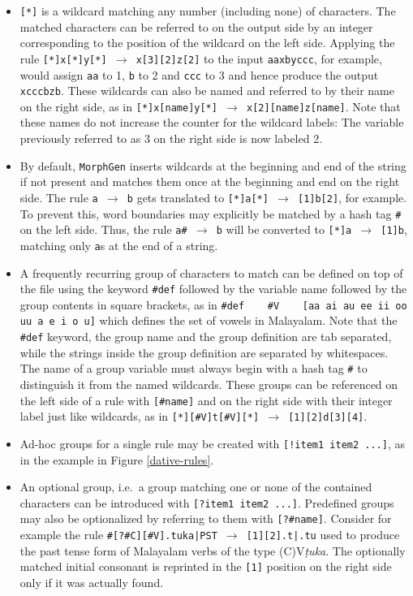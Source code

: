 \documentclass[a4paper]{article}
\newcommand{\tab}{~~~}
\newcommand{\arr}{$\rightarrow$ }
\newcommand{\typ}[1]{\texttt{#1}}
\begin{document}
\begin{itemize}
\item{} \typ{[*]} is a wildcard matching any number (including none) of characters. The matched characters can be referred to on the output side by an integer corresponding to the position of the wildcard on the left side. Applying the rule \typ{[*]x[*]y[*] \arr x[3][2]z[2]} to the input \typ{aaxbyccc}, for example, would assign \typ{aa} to 1, \typ{b} to 2 and \typ{ccc} to 3 and hence produce the output \typ{xcccbzb}. These wildcards can also be named and referred to by their name on the right side, as in \typ{[*]x[name]y[*] \arr x[2][name]z[name]}. Note that these names do not increase the counter for the wildcard labels: The variable previously referred to as 3 on the right side is now labeled 2.

\item By default, \typ{MorphGen} inserts wildcards at the beginning and end of the string if not present and matches them once at the beginning and end on the right side. The rule \typ{a \arr b} gets translated to \typ{[*]a[*] \arr [1]b[2]}, for example. To prevent this, word boundaries may explicitly be matched by a hash tag \typ{\#} on the left side. Thus, the rule \typ{a\# \arr b} will be converted to \typ{[*]a \arr [1]b}, matching only \typ{a}s at the end of a string.

\item A frequently recurring group of characters to match can be defined on top of the file using the keyword \typ{\#def} followed by the variable name followed by the group contents in square brackets, as in \typ{\#def \tab \#V \tab [aa ai au ee ii oo uu a e i o u]} which defines the set of vowels in Malayalam. Note that the \typ{\#def} keyword, the group name and the group definition are tab separated, while the strings inside the group definition are separated by whitespaces. The name of a group variable must always begin with a hash tag \typ{\#} to distinguish it from the named wildcards. These groups can be referenced on the left side of a rule with \typ{[\#name]} and on the right side with their integer label just like wildcards, as in \typ{[*][\#V]t[\#V][*] \arr [1][2]d[3][4]}.

\item Ad-hoc groups for a single rule may be created with \typ{[!item1 item2 ...]}, as in the example in Figure \ref{dative-rules}.

\item An optional group, i.e.\ a group matching one or none of the contained characters can be introduced with \typ{[?item1 item2 ...]}. Predefined groups may also be optionalized by referring to them with \typ{[?\#name]}. Consider for example the rule \typ{\#[?\#C][\#V].tuka|PST \arr [1][2].t|.tu} used to produce the past tense form of Malayalam verbs of the type (C)V\textit{ṭuka}. The optionally matched initial consonant is reprinted in the \typ{[1]} position on the right side only if it was actually found.


\end{itemize}
\end{document}
